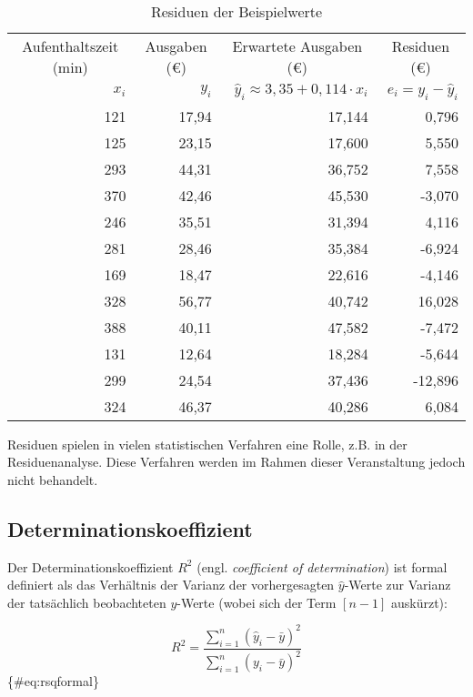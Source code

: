 \documentclass[
  ngerman,
]{article}
\begin{document}
\begin{table}

\caption{\label{tab:unnamed-chunk-25}\label{tab:res}Residuen der Beispielwerte}
\centering
\begin{tabular}[t]{rrrr}
\toprule
\multicolumn{1}{c}{Aufenthaltszeit (min)} & \multicolumn{1}{c}{Ausgaben (€)} & \multicolumn{1}{c}{Erwartete Ausgaben (€)} & \multicolumn{1}{c}{Residuen (€)} \\
\cmidrule(l{3pt}r{3pt}){1-1} \cmidrule(l{3pt}r{3pt}){2-2} \cmidrule(l{3pt}r{3pt}){3-3} \cmidrule(l{3pt}r{3pt}){4-4}
$x_i$ & $y_i$ & $\hat{y}_i\approx3,35+0,114\cdot x_i$ & $e_i=y_i-\hat{y}_i$\\
\midrule
121 & 17,94 & 17,144 & 0,796\\
125 & 23,15 & 17,600 & 5,550\\
293 & 44,31 & 36,752 & 7,558\\
370 & 42,46 & 45,530 & -3,070\\
246 & 35,51 & 31,394 & 4,116\\
281 & 28,46 & 35,384 & -6,924\\
169 & 18,47 & 22,616 & -4,146\\
328 & 56,77 & 40,742 & 16,028\\
388 & 40,11 & 47,582 & -7,472\\
131 & 12,64 & 18,284 & -5,644\\
299 & 24,54 & 37,436 & -12,896\\
324 & 46,37 & 40,286 & 6,084\\
\bottomrule
\end{tabular}
\end{table}

Residuen spielen in vielen statistischen Verfahren eine Rolle, z.B. in der Residuenanalyse. Diese Verfahren werden im Rahmen dieser Veranstaltung jedoch nicht behandelt.

\hypertarget{determinationskoeffizient}{%
\subsection{Determinationskoeffizient}\label{determinationskoeffizient}}

Der Determinationskoeffizient \(R^2\) (engl. \emph{coefficient of determination}) ist formal definiert als das Verhältnis der Varianz der vorhergesagten \(\hat{y}\)-Werte zur Varianz der tatsächlich beobachteten \(y\)-Werte (wobei sich der Term \([n-1]\) auskürzt):

\[
R^2=\frac{\sum\limits^n_{i=1}(\hat{y}_i-\bar{y})^2}{\sum\limits^n_{i=1}(y_i-\bar{y})^2}
\]\{\#eq:rsqformal\}
\end{document}
